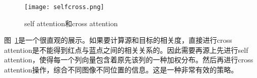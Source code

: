 \begin{figure}[h]
  \centering
  \texttt{[image: selfcross.png]}
  \caption{self attention和cross attention}
  \label{fig:selfcross}
\end{figure}

图~\ref{fig:selfcross}是一个很直观的展示。如果要计算源和目标的相关度，直接进行cross attention是不能得到红点与蓝点之间的相关关系的。因此需要再源上先进行self attention，使得每一个列向量包含着原先该列的一种加权分布。然后再进行cross attention操作，综合不同图像不同位置的信息。这是一种非常有效的策略。



